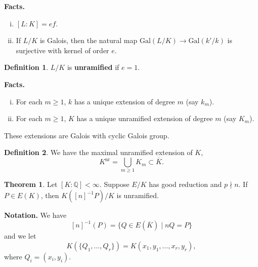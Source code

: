 \documentclass{article}
\theoremstyle{definition}
\newtheorem{theorem}{Theorem}[section]
\newtheorem{defn}{Definition}[section]
\begin{document}
\textbf{Facts.} 
\begin{enumerate}[(i)]
    \item $[L:K] = ef$.
    \item If $L/K$ is Galois, then the natural map $\text{Gal}(L/K) \to \text{Gal}(k'/k)$ is surjective with kernel of order $e$.
\end{enumerate}
\begin{defn}
    $L/K$ is \textbf{unramified} if $e=1$.
\end{defn}
\textbf{Facts.}
\begin{enumerate}[(i)]
    \item For each $m\ge 1$, $k$ has a unique extension of degree $m$ (say $k_m$).
    \item For each $m\ge 1$, $K$ has a unique unramified extension of degree $m$ (say $K_m$).
\end{enumerate} 
These extensions are Galois with cyclic Galois group.
\begin{defn}
    We have the maximal unramified extension of $K$, $$K^{\text{nr}} = \bigcup_{m\ge 1} K_m \subset \overline{K}.$$
\end{defn}
\begin{theorem}\label{theorem9.8}
    Let $[K:\mathbb{Q}]<\infty$. Suppose $E/K$ has good reduction and $p \nmid n$. If $P \in E(K)$, then $K([n]^{-1}P)/K$ is unramified.
\end{theorem}
\textbf{Notation.} We have
\[
[n]^{-1}(P)=\{Q \in E(\overline{K}) \mid nQ=P\}
\] 
and we let 
\[
K(\{Q_1,\ldots,Q_r\})=K(x_1,y_1,\ldots,x_r,y_r),
\]
where $Q_i = (x_i,y_i)$.
\end{document}
